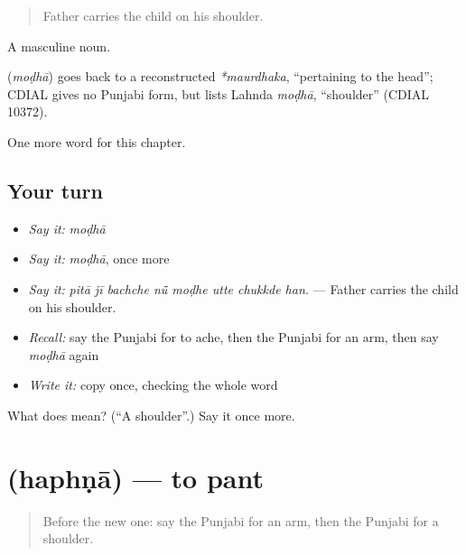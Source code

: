 \begin{quote}
Father carries the child on his shoulder.
\end{quote}

A masculine noun.

\begin{cousinweb}
\textbf{} (\emph{moḍhā}) goes back to a reconstructed \emph{*maurdhaka}, \textquotedblleft{}pertaining to the head\textquotedblright{}; CDIAL gives no Punjabi form, but lists Lahnda \emph{moḍhā}, \textquotedblleft{}shoulder\textquotedblright{} (CDIAL 10372).
\end{cousinweb}

\begin{grammarlens}[title={What you've built}]
One more word for this chapter.
\end{grammarlens}

\subsection*{Your turn}
\begin{itemize}
\raggedright
  \item \emph{Say it:} \emph{moḍhā}
  \item \emph{Say it:} \emph{moḍhā}, once more
  \item \emph{Say it:} \emph{pitā jī bachche nū̃ moḍhe utte chukkde han.} — Father carries the child on his shoulder.
  \item \emph{Recall:} say the Punjabi for to ache, then the Punjabi for an arm, then say \emph{moḍhā} again
  \item \emph{Write it:} copy \textbf{} once, checking the whole word
\end{itemize}

\begin{tcolorbox}[breakable,colback=teal!4,colframe=teal!35!black,title={Before you move on}]
What does  mean? (\textquotedblleft{}A shoulder\textquotedblright{}.) Say it once more.
\end{tcolorbox}
\section[\texorpdfstring{\pa{ਹਫਣਾ} (haphṇā)}{ਹਫਣਾ (haphṇā)}]{ (haphṇā) — to pant}

\label{lesson:PA-C324-haphna}



\begin{quote}
Before the new one: say the Punjabi for an arm, then the Punjabi for a shoulder.
\end{quote}

